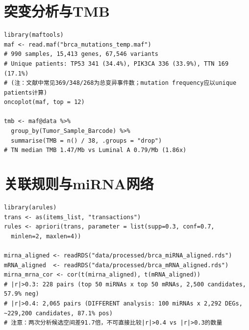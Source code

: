 \documentclass[12pt,a4paper,openany]{ctexbook}
\begin{document}
\section{突变分析与TMB}
\begin{lstlisting}[caption={maftools突变分析与TMB}, basicstyle=\ttfamily\scriptsize]
library(maftools)
maf <- read.maf("brca_mutations_temp.maf")
# 990 samples, 15,413 genes, 67,546 variants
# Unique patients: TP53 341 (34.4%), PIK3CA 336 (33.9%), TTN 169 (17.1%)
# (注：文献中常见369/348/268为总变异事件数；mutation frequency应以unique patients计算)
oncoplot(maf, top = 12)

tmb <- maf@data %>%
  group_by(Tumor_Sample_Barcode) %>%
  summarise(TMB = n() / 38, .groups = "drop")
# TN median TMB 1.47/Mb vs Luminal A 0.79/Mb (1.86x)
\end{lstlisting}

\section{关联规则与miRNA网络}
\begin{lstlisting}[caption={Apriori关联规则与miRNA-mRNA相关}, basicstyle=\ttfamily\scriptsize]
library(arules)
trans <- as(items_list, "transactions")
rules <- apriori(trans, parameter = list(supp=0.3, conf=0.7,
  minlen=2, maxlen=4))

mirna_aligned <- readRDS("data/processed/brca_miRNA_aligned.rds")
mRNA_aligned  <- readRDS("data/processed/brca_mRNA_aligned.rds")
mirna_mrna_cor <- cor(t(mirna_aligned), t(mRNA_aligned))
# |r|>0.3: 228 pairs (top 50 miRNAs x top 50 mRNAs, 2,500 candidates, 57.9% neg)
# |r|>0.4: 2,065 pairs (DIFFERENT analysis: 100 miRNAs x 2,292 DEGs, ~229,200 candidates, 87.1% pos)
# 注意：两次分析候选空间差91.7倍，不可直接比较|r|>0.4 vs |r|>0.3的数量
\end{lstlisting}
\end{document}
